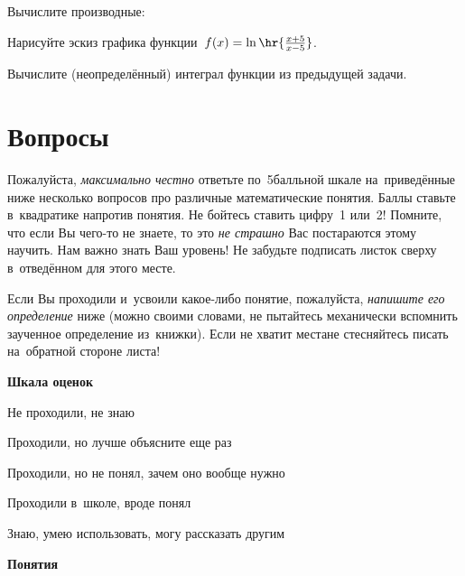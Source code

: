 \documentclass[draft]{article}
\begin{document}
\begin{problem}
Вычислите производные:
\end{problem}

\begin{problem}
Нарисуйте эскиз графика функции~$f(x)=\ln \hr{\frac{x+5}{x-5}}$.
\end{problem}

\begin{problem}
Вычислите (неопределённый) интеграл функции из предыдущей задачи.
\end{problem}

\newpage
{}

\section{Вопросы}

Пожалуйста, \emph{максимально честно} ответьте по~5\д балльной шкале на~приведённые
ниже несколько вопросов
про различные математические понятия. Баллы ставьте в~квадратике напротив понятия.
Не бойтесь ставить цифру~1 или~2! Помните,
что если Вы чего-то не знаете, то это \emph{не страшно}\т
Вас постараются этому научить. Нам важно знать Ваш уровень! Не забудьте подписать листок
сверху в~отведённом для этого месте.

Если Вы проходили и~усвоили какое-либо понятие, пожалуйста, \emph{напишите его определение}
ниже (можно своими словами, не пытайтесь механически
вспомнить заученное определение из~книжки). Если не хватит места\т не стесняйтесь писать на~обратной
стороне листа!

\medskip
\centerline{\textbf{Шкала оценок}}
\begin{nums}{-4}
\item Не проходили, не знаю
\item Проходили, но лучше объясните еще раз
\item Проходили, но не понял, зачем оно вообще нужно
\item Проходили в~школе, вроде понял
\item Знаю, умею использовать, могу рассказать другим
\end{nums}

\def\bx{\lower2mm\hbox{\epsfbox{pictures.20}}}
\def\ro#1{\leftline{\bx~#1}}

\centerline{\textbf{Понятия}}
\medskip
\end{document}
